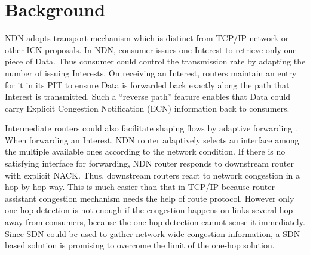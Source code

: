
\section{Background}

\label{sec:bg}


NDN adopts transport mechanism \cite{NDN, Adaptive} which is distinct from TCP/IP network or other ICN proposals. In NDN, consumer issues one Interest to retrieve only one piece of Data. Thus consumer could control the transmission rate by adapting the number of issuing Interests. On receiving an Interest, routers maintain an entry for it in its PIT to ensure Data is forwarded back exactly along the path that Interest is transmitted. Such a ``reverse path'' feature enables that Data could carry Explicit Congestion Notification (ECN) information back to consumers.


Intermediate routers could also facilitate shaping flows by adaptive forwarding \cite{Adaptive}. When forwarding an Interest, NDN router adaptively selects an interface among the multiple available ones according to the network condition. If there is no satisfying interface for forwarding, NDN router responds to downstream router with explicit NACK. Thus, downstream routers react to network congestion in a hop-by-hop way. This is much easier than that in TCP/IP because router-assistant congestion mechanism needs the help of route protocol\cite{selfish}. However only one hop detection is not enough if the congestion happens on links several hop away from consumers, because the one hop detection cannot sense it immediately. Since SDN\cite{SDN} could be used to gather network-wide congestion information, a SDN-based solution is promising to overcome the limit of the one-hop solution.




